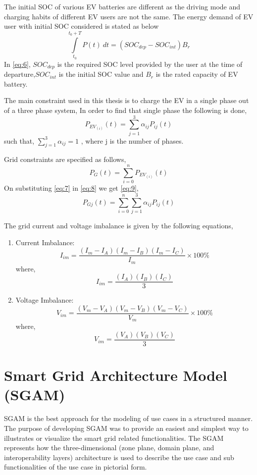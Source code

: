 \documentclass{article}
\begin{document}
The initial SOC of various EV batteries are different as the driving mode and charging habits of different EV users are not the same. The energy demand of EV user with initial SOC considered is stated as below
\[\int\limits_{t_0}^{t_0+T} P(t) \ dt = ({SOC_{dep}}-{SOC_{int}}){B_r}\tag{6} \label{eq:6}\]
In \eqref{eq:6}, \({SOC_{dep}}\) is the required SOC level provided by the user at the time of departure,\({SOC_{int}}\) is the initial SOC value and \({B_r}\) is the rated capacity of EV battery.

The main constraint used in this thesis is to charge the EV in a single phase out of a three phase system, In order to find that single phase the following is done,
\[{P_{EV_{(i)}}(t)} = \sum \limits_{j=1}^{3} \alpha_{ij} {P_{ij}(t)}\tag{7} \label{eq:7}\]
such that, \(\sum \limits_{j=1}^{3} \alpha_{ij} = 1\) , where j is the number of phases.

Grid constraints are specified as follows,
\[{P_{G}(t)} = \sum \limits_{i=0}^{n} {P_{EV_{(i)}}(t)}\tag{8} \label{eq:8}\]
On substituting \eqref{eq:7} in \eqref{eq:8} we get \eqref{eq:9},
\[{P_{Gj}(t)} = \sum \limits_{i=0}^{n} \sum \limits_{j=1}^{3} \alpha_{ij} {P_{ij}(t)} \tag{9} \label{eq:9}\]

The grid current and voltage imbalance is given by the following equations,
\begin{enumerate}
	\item Current Imbalance:
	\[I_{im} = \frac {(I_{m} - I_{A}) (I_{m} - I_{B}) (I_{m} - I_{C})} {I_{m}} \times 100\% \tag{10} \label{eq:10} \]
	where, \[I_{im} = \frac {(I_{A}) (I_{B}) (I_{C})}
	{3}\]
	\item Voltage Imbalance:
	\[V_{im} = \frac {(V_{m} - V_{A}) (V_{m} - V_{B}) (V_{m} - V_{C})} {V_{m}} \times 100\% \tag{10} \label{eq:10} \]
	where, \[V_{im} = \frac {(V_{A}) (V_{B}) (V_{C})}
	{3}\]
\end{enumerate}


\section{Smart Grid Architecture Model (SGAM)}\label{chap:Smart Grid Architecture Model (SGAM)}
SGAM is the best approach for the modeling of use cases in a structured manner. The purpose
of developing SGAM was to provide an easiest and simplest way to illustrates or visualize the
smart grid related functionalities. The SGAM represents how the three-dimensional (zone plane,
domain plane, and interoperability layers) architecture is used to describe the use case and sub
functionalities of the use case in pictorial form.
\end{document}
